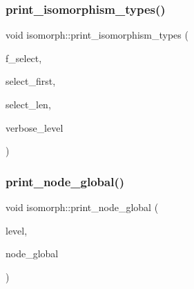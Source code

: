 \mbox{\label{classisomorph_abbcd12f6434585951a5532d0b2467a00}} 
\subsubsection{\texorpdfstring{print\+\_\+isomorphism\+\_\+types()}{print\_isomorphism\_types()}}
{\footnotesize\ttfamily void isomorph\+::print\+\_\+isomorphism\+\_\+types (\begin{DoxyParamCaption}\item[{\mbox{\hyperlink{galois_8h_a09fddde158a3a20bd2dcadb609de11dc}{I\+NT}}}]{f\+\_\+select,  }\item[{\mbox{\hyperlink{galois_8h_a09fddde158a3a20bd2dcadb609de11dc}{I\+NT}}}]{select\+\_\+first,  }\item[{\mbox{\hyperlink{galois_8h_a09fddde158a3a20bd2dcadb609de11dc}{I\+NT}}}]{select\+\_\+len,  }\item[{\mbox{\hyperlink{galois_8h_a09fddde158a3a20bd2dcadb609de11dc}{I\+NT}}}]{verbose\+\_\+level }\end{DoxyParamCaption})}

\mbox{\label{classisomorph_ac62bed8edc25b5b50cc4f275f94c8470}} 
\subsubsection{\texorpdfstring{print\+\_\+node\+\_\+global()}{print\_node\_global()}}
{\footnotesize\ttfamily void isomorph\+::print\+\_\+node\+\_\+global (\begin{DoxyParamCaption}\item[{\mbox{\hyperlink{galois_8h_a09fddde158a3a20bd2dcadb609de11dc}{I\+NT}}}]{level,  }\item[{\mbox{\hyperlink{galois_8h_a09fddde158a3a20bd2dcadb609de11dc}{I\+NT}}}]{node\+\_\+global }\end{DoxyParamCaption})}

\mbox{\label{classisomorph_a0c0aa4acce86bf0b479a216a3afdabcc}} 
